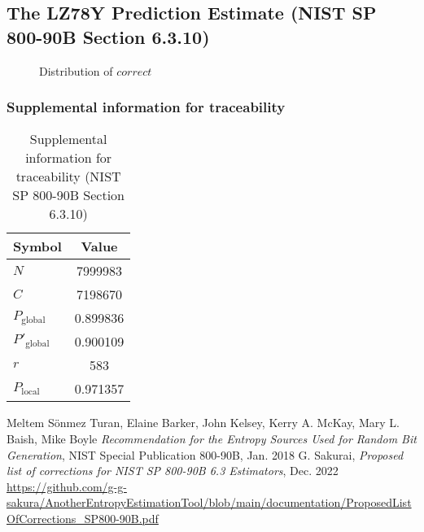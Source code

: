 \documentclass[a3paper,xelatex,english]{bxjsarticle}
\begin{document}
\subsection{The LZ78Y Prediction Estimate (NIST SP 800-90B Section 6.3.10)}
\begin{figure}[htbp]
\caption{Distribution of $correct$}
\end{figure}
\subsubsection{Supplemental information for traceability}
\renewcommand{\arraystretch}{1.8}
\begin{table}[h]
\caption{Supplemental information for traceability (NIST SP 800-90B Section 6.3.10)}
\begin{center}
\begin{tabular}{|l|c|}
\hline 
\rowcolor{anotherlightblue} %
Symbol				& Value \\ \hline 
$N$				& 7999983\\ \hline 
$C$				& 7198670\\ \hline 
$P_{\textrm{global}}$				& 0.899836\\ \hline 
$P'_{\textrm{global}}$			& 0.900109\\ \hline 
$r$				& 583\\ \hline 
$P_{\textrm{local}}$ 			& 0.971357\\ \hline
\end{tabular}
\end{center}
\end{table}
\renewcommand{\arraystretch}{1.4}
\begin{thebibliography}{99}
Meltem S\"{o}nmez Turan,
Elaine Barker,
John Kelsey,
Kerry A. McKay,
Mary L. Baish,
Mike Boyle
\textit{Recommendation for the Entropy Sources Used for Random Bit Generation},
NIST Special Publication 800-90B, Jan. 2018
G. Sakurai, \textit{Proposed list of corrections for NIST SP 800-90B 6.3 Estimators}, Dec. 2022
\url{https://github.com/g-g-sakura/AnotherEntropyEstimationTool/blob/main/documentation/ProposedListOfCorrections_SP800-90B.pdf}
\end{thebibliography}
\end{document}
